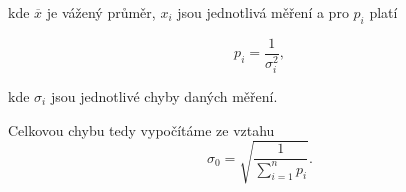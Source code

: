 \documentclass[english]{article}
\begin{document}
	kde $\overline{x}$ je vážený průměr, $x_{i}$ jsou jednotlivá měření a pro $p_{i}$ platí
	 
	\begin{equation}
	p_{i}=\frac{1}{\sigma_{i}^{2}},
	\end{equation}
	
	kde $\sigma_{i}$ jsou jednotlivé chyby daných měření.
	 
	Celkovou chybu tedy vypočítáme ze vztahu
	\begin{equation} \label{eq:chyba_vazeny_prumer}
	\sigma_{0}=\sqrt{\frac{1}{\sum\limits_{i=1}^{n}p_{i}}}.
	\end{equation}
%
%
\end{document}
